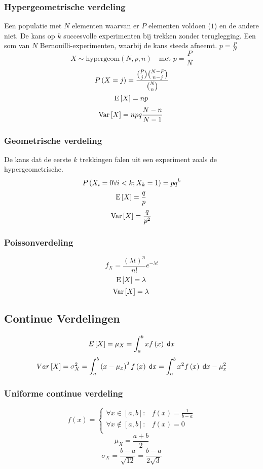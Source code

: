   \subsubsection{Hypergeometrische verdeling}
  Een populatie met $N$ elementen waarvan er $P$ elementen voldoen ($1$) en de andere niet. De kans op $k$ succesvolle experimenten bij trekken zonder teruglegging. Een som van $N$ Bernouilli-experimenten, waarbij de kans steeds afneemt. $p=\frac{P}{N}$
  \[
    X \sim \mathrm{hypergeom}\left(N,p,n\right) \quad \mbox{met } p = \frac{P}{N}
  \]
  \[
    P\left(X = j\right) = \frac{\binom{P}{j} \binom{N-P}{n-j}}{ \binom{N}{n}}
  \]
  \[
    \!\mathrm{E}\left[ X \right] = np
  \]
  \[
    \!\mathrm{Var}\left[ X \right] = npq\frac{N-n}{N-1}
  \]

  \subsubsection{Geometrische verdeling}
  De kans dat de eerste $k$ trekkingen falen uit een experiment zoals de hypergeometrische.
  \[
    P\left(X_i = 0 \forall i < k; X_k = 1\right) = pq^k
  \]
  \[
    \!\mathrm{E}\left[ X \right] = \frac{q}{p}
  \]
  \[
    \!\mathrm{Var}\left[ X \right] = \frac{q}{p^2}
  \]

  \subsubsection{Poissonverdeling}
  \[
    f_X = \frac{\left(\lambda t\right)^n}{n!}e^{-\lambda t}
  \]
  \[
    \!\mathrm{E}\left[ X \right] = \lambda
  \]
  \[
    \!\mathrm{Var}\left[ X \right] = \lambda
  \]

\subsection{Continue Verdelingen}
\label{sec:ContinueVerdelingen}
  \[
    E\left[X\right]   =\mu_X
                      =\int_a^b xf\left(x\right) \;\textsf{d}x
  \]
  \[
    Var\left[X\right] = \sigma^2_X
                      = \int_a^b \left(x-\mu_x\right)^2 f\left(x\right) \;\textsf{d}x
                      = \int_a^b x^2 f\left(x\right) \;\textsf{d}x - \mu_x^2
  \]


\subsubsection{Uniforme continue verdeling}
\label{sec:UniformeContinueVerdeling}
  \[
    f\left(x\right)
     = \left\{
          \begin{array}{ll}
             \forall x \in \left[a,b\right] : & f\left(x\right)= \frac{1}{b-a}\\
             \forall x \not\in \left[a,b\right] : & f\left(x\right)= 0\\
          \end{array}%
        \right.
  \]
  \[
    \mu_X = \frac{a+b}{2}
  \]
  \[
    \sigma_X = \frac{b-a}{\sqrt{12}} = \frac{b-a}{2\sqrt{3}}
  \]

